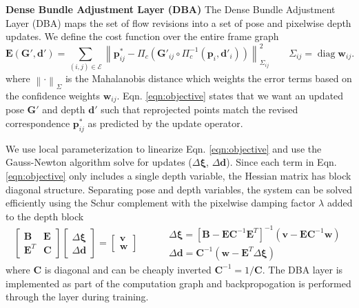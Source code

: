 \documentclass{article}
\DeclareMathOperator{\diag}{diag}
\newcommand{\norm}[1]{\left\lVert#1\right\rVert}
\begin{document}
\noindent \textbf{Dense Bundle Adjustment Layer (DBA)} The Dense Bundle Adjustment Layer (DBA) maps the set of flow revisions into a set of pose and pixelwise depth updates. We define the cost function over the entire frame graph
\begin{equation}
    \mathbf E(\mathbf{G}', \mathbf{d}') = \sum_{(i,j) \in \mathcal{E}} \norm{\mathbf{p}_{ij}^* - \Pi_c(\mathbf{G}'_{ij} \circ \Pi_c^{-1}(\mathbf{p}_i, \mathbf{d}'_i)) }_{\Sigma_{ij}}^2 \qquad \Sigma_{ij} = \diag \mathbf{w}_{ij}
    \label{eqn:objective}.
\end{equation}
where $\norm{\cdot}_{\Sigma}$ is the Mahalanobis distance which weights the error terms based on the confidence weights $\mathbf{w}_{ij}$. Eqn. \ref{eqn:objective} states that we want an updated pose $\mathbf{G}'$ and depth $\mathbf{d}'$ such that reprojected points match the revised correspondence $\mathbf{p}_{ij}^*$ as predicted by the update operator.

We use local parameterization to linearize Eqn. \ref{eqn:objective} and use the Gauss-Newton algorithm solve for updates ($\Delta \boldsymbol\xi$, $\Delta \mathbf d$). Since each term in Eqn. \ref{eqn:objective} only includes a single depth variable, the Hessian matrix has block diagonal structure. Separating pose and depth variables, the system can be solved efficiently using the Schur complement with the pixelwise damping factor $\lambda$ added to the depth block
\begin{equation}
    \begin{bmatrix} \mathbf{B} & \mathbf{E} \\ \mathbf{E}^T & \mathbf{C} \end{bmatrix} \begin{bmatrix} \Delta \boldsymbol \xi \\ \Delta \mathbf d \end{bmatrix} = \begin{bmatrix} \mathbf v \\ \mathbf w \end{bmatrix} \qquad
    \begin{array}{ll}
         &\Delta \boldsymbol \xi = [\mathbf B - \mathbf E \mathbf C^{-1} \mathbf E^T]^{-1}(\mathbf v - \mathbf E \mathbf C^{-1} \mathbf w) \\
         &\Delta \mathbf d = \mathbf C^{-1}(\mathbf w - \mathbf E^T\Delta \boldsymbol \xi)
    \end{array}
\end{equation}
where $\mathbf{C}$ is diagonal and can be cheaply inverted $\mathbf{C}^{-1} = 1 / \mathbf{C}$. The DBA layer is implemented as part of the computation graph and backpropogation is performed through the layer during training.
\end{document}
